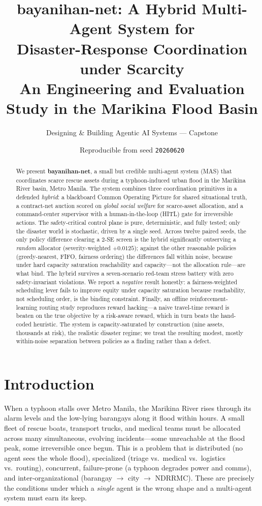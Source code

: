 \documentclass[11pt]{article}
\title{\textbf{bayanihan-net}: A Hybrid Multi-Agent System for\\
Disaster-Response Coordination under Scarcity\\[4pt]
\large An Engineering and Evaluation Study in the Marikina Flood Basin}
\author{Designing \& Building Agentic AI Systems --- Capstone}
\date{Reproducible from seed \texttt{20260620}}
\begin{document}
\maketitle

\begin{abstract}
We present \textbf{bayanihan-net}, a small but credible multi-agent system (MAS) that coordinates
scarce rescue assets during a typhoon-induced urban flood in the Marikina River basin, Metro Manila.
The system combines three coordination primitives in a defended \emph{hybrid}: a blackboard Common
Operating Picture for shared situational truth, a contract-net auction scored on \emph{global social
welfare} for scarce-asset allocation, and a command-center supervisor with a human-in-the-loop (HITL)
gate for irreversible actions. The safety-critical control plane is pure, deterministic, and fully
tested; only the disaster world is stochastic, driven by a single seed. Across twelve paired seeds, the
only policy difference clearing a 2-SE screen is the hybrid significantly outserving a \emph{random}
allocator (severity-weighted $+0.0125$); against the other reasonable policies (greedy-nearest, FIFO,
fairness ordering) the differences fall within noise, because under hard capacity saturation reachability
and capacity---not the allocation rule---are what bind. The hybrid survives a seven-scenario red-team
stress battery with zero safety-invariant violations. We
report a \emph{negative} result honestly: a fairness-weighted scheduling lever fails to improve equity
under capacity saturation because reachability, not scheduling order, is the binding constraint. Finally,
an offline reinforcement-learning routing study reproduces reward hacking---a naive travel-time reward is
beaten on the true objective by a risk-aware reward, which in turn beats the hand-coded heuristic. The
system is capacity-saturated by construction (nine assets, thousands at risk), the realistic disaster
regime; we treat the resulting modest, mostly within-noise separation between policies as a finding
rather than a defect.
\end{abstract}

\section{Introduction}
When a typhoon stalls over Metro Manila, the Marikina River rises through its alarm levels and the
low-lying barangays along it flood within hours. A small fleet of rescue boats, transport trucks, and
medical teams must be allocated across many simultaneous, evolving incidents---some unreachable at the
flood peak, some irreversible once begun. This is a problem that is distributed (no agent sees the whole
flood), specialized (triage vs.\ medical vs.\ logistics vs.\ routing), concurrent, failure-prone (a
typhoon degrades power and comms), and inter-organizational (barangay $\to$ city $\to$ NDRRMC). These are
precisely the conditions under which a \emph{single} agent is the wrong shape and a multi-agent system
must earn its keep.
\end{document}

